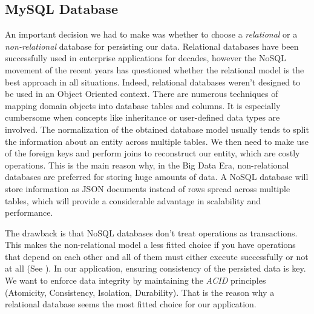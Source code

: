 \subsection{MySQL Database}
\label{section:mysqlDatabase}


An important decision we had to make was whether to choose a \textit{relational} or a \textit{non-relational} database for persisting our data. Relational databases have been successfully used in enterprise applications for decades, however the NoSQL movement of the recent years has questioned whether the relational model is the best approach in all situations. Indeed, relational databases weren't designed to be used in an Object Oriented context. There are numerous techniques of mapping domain objects into database tables and columns. It is especially cumbersome when concepts like inheritance or user-defined data types are involved. The normalization of the obtained database model usually tends to split the information about an entity across multiple tables. We then need to make use of the foreign keys and perform joins to reconstruct our entity, which are costly operations. This is the main reason why, in the Big Data Era, non-relational databases are preferred for storing huge amounts of data. A NoSQL database will store information as JSON documents instead of rows spread across multiple tables, which will provide a considerable advantage in scalability and performance.

The drawback is that NoSQL databases don't treat operations as transactions. This makes the non-relational model a less fitted choice if you have operations that depend on each other and all of them must either execute successfully or not at all (See \cite{conciseGuideToDatabases}). In our application, ensuring consistency of the persisted data is key. We want to enforce data integrity by maintaining the \textit{ACID} principles (Atomicity, Consistency, Isolation, Durability). That is the reason why a relational database seems the most fitted choice for our application.

